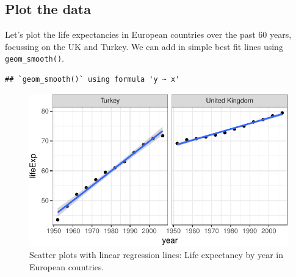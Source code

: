 \documentclass[
  12pt,
  krantz2]{krantz}
\makeatletter
\newenvironment{Shaded}{\begin{snugshade}}{\end{snugshade}}
\newcommand{\CommentTok}[1]{\textcolor[rgb]{0.56,0.35,0.01}{\textit{#1}}}
\newcommand{\DataTypeTok}[1]{\textcolor[rgb]{0.13,0.29,0.53}{#1}}
\newcommand{\DecValTok}[1]{\textcolor[rgb]{0.00,0.00,0.81}{#1}}
\newcommand{\KeywordTok}[1]{\textcolor[rgb]{0.13,0.29,0.53}{\textbf{#1}}}
\newcommand{\NormalTok}[1]{#1}
\newcommand{\OperatorTok}[1]{\textcolor[rgb]{0.81,0.36,0.00}{\textbf{#1}}}
\newcommand{\StringTok}[1]{\textcolor[rgb]{0.31,0.60,0.02}{#1}}
\newenvironment{kframe}{%
\medskip{}
\setlength{\fboxsep}{.8em}
 \def\at@end@of@kframe{}%
 \ifinner\ifhmode%
  \def\at@end@of@kframe{\end{minipage}}%
  \begin{minipage}{\columnwidth}%
 \fi\fi%
 \def\FrameCommand##1{\hskip\@totalleftmargin \hskip-\fboxsep
 \colorbox{shadecolor}{##1}\hskip-\fboxsep
     \hskip-\linewidth \hskip-\@totalleftmargin \hskip\columnwidth}%
 \MakeFramed {\advance\hsize-\width
   \@totalleftmargin\z@ \linewidth\hsize
   \@setminipage}}%
 {\par\unskip\endMakeFramed%
 \at@end@of@kframe}
\renewenvironment{Shaded}{\begin{kframe}}{\end{kframe}}
\makeatother
\begin{document}
\hypertarget{plot-the-data-3}{%
\subsection{Plot the data}\label{plot-the-data-3}}

Let's plot the life expectancies in European countries over the past 60 years, focussing on the UK and Turkey.
We can add in simple best fit lines using \texttt{geom\_smooth()}.

\begin{Shaded}
\end{Shaded}

\begin{verbatim}
## `geom_smooth()` using formula 'y ~ x'
\end{verbatim}

\begin{figure}
\centering
\includegraphics{07_linear_regression_files/figure-latex/unnamed-chunk-4-1.pdf}
\caption{\label{fig:unnamed-chunk-4}Scatter plots with linear regression lines: Life expectancy by year in European countries.}
\end{figure}
\end{document}
